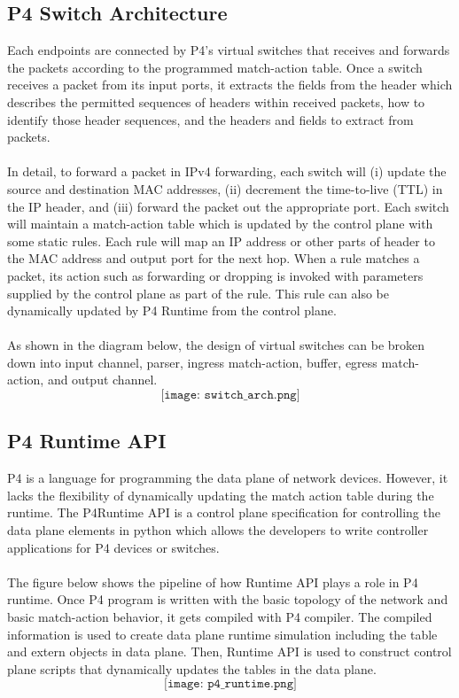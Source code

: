 \subsection{P4 Switch Architecture}
Each endpoints are connected by P4's virtual switches that receives and forwards the packets according to the programmed match-action table. Once a switch receives a packet from its input ports, it extracts the fields from the header which describes the permitted sequences of headers within received packets, how to identify those header sequences, and the headers and fields to extract from packets.\\
\\
In detail, to forward a packet in IPv4 forwarding, each switch will (i) update the source and destination MAC addresses, (ii) decrement the time-to-live (TTL) in the IP header, and (iii) forward the packet out the appropriate port. Each switch will maintain a match-action table which is updated by the control plane with some static rules. Each rule will map an IP address or other parts of header to the MAC address and output port for the next hop. When a rule matches a packet, its action such as forwarding or dropping is invoked with parameters supplied by the control plane as part of the rule. This rule can also be dynamically updated by P4 Runtime from the control plane. \\
\\
As shown in the diagram below, the design of virtual switches can be broken down into input channel, parser, ingress match-action, buffer, egress match-action, and output channel.
$$
\texttt{[image: switch\_arch.png]}
$$
\subsection{P4 Runtime API}
P4 is a language for programming the data plane of network devices. However, it lacks the flexibility of dynamically updating the match action table during the runtime. The P4Runtime API is a control plane specification for controlling the data plane elements in python which allows the developers to write controller applications for P4 devices or switches. \\
\\
The figure below shows the pipeline of how Runtime API plays a role in P4 runtime. Once P4 program is written with the basic topology of the network and basic match-action behavior, it gets compiled with P4 compiler. The compiled information is used to create data plane runtime simulation including the table and extern objects in data plane. Then, Runtime API is used to construct control plane scripts that dynamically updates the tables in the data plane.
$$
\texttt{[image: p4\_runtime.png]}
$$

